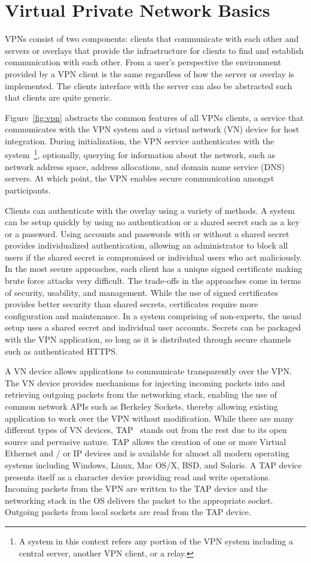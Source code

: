 \section{Virtual Private Network Basics}
VPNs consist of two components: clients that communicate with each other and
servers or overlays that provide the infrastructure for clients to find and
establish communication with each other.  From a user's perspective the
environment provided by a VPN client is the same regardless of how the server
or overlay is implemented.  The clients interface with the server can also
be abstracted such that clients are quite generic.

Figure~\ref{fig:vpn} abstracts the common features of all VPNs clients, a
service that communicates with the VPN system and a virtual network (VN) device
for host integration.  During initialization, the VPN service authenticates
with the system~\footnote{A system in this context refers any portion of the
VPN system including a central server, another VPN client, or a relay.},
optionally, querying for information about the network, such as network address
space, address allocations, and domain name service (DNS) servers.  At which
point, the VPN enables secure communication amongst participants.

Clients can authenticate with the overlay using a variety of methods.  A system
can be setup quickly by using no authentication or a shared secret such as a key
or a password.  Using accounts and passwords with or without a shared secret
provides individualized authentication, allowing an administrator to block all
users if the shared secret is compromised or individual users who act
maliciously.  In the most secure approaches, each client has a unique signed
certificate making brute force attacks very difficult.  The trade-offs in the
approaches come in terms of security, usability, and management.  While the use
of signed certificates provides better security than shared secrets,
certificates require more configuration and maintenance.  In a system comprising
of non-experts, the usual setup uses a shared secret and individual user
accounts.  Secrets can be packaged with the VPN application, so long as it is
distributed through secure channels such as authenticated HTTPS.

A VN device allows applications to communicate transparently over the VPN.  The
VN device provides mechanisms for injecting incoming packets into and retrieving
outgoing packets from the networking stack, enabling the use of common network
APIs such as Berkeley Sockets, thereby allowing existing application to work over
the VPN without modification.  While there are many different types of VN
devices, TAP~\cite{tap} stands out from the rest due to its open source and
pervasive nature.  TAP allows the creation of one or more Virtual Ethernet and
/ or IP devices and is available for almost all modern operating systems
including Windows, Linux, Mac OS/X, BSD, and Solaris.  A TAP device presents
itself as a character device providing read and write operations.  Incoming
packets from the VPN are written to the TAP device and the networking stack in
the OS delivers the packet to the appropriate socket.  Outgoing packets from
local sockets are read from the TAP device.


